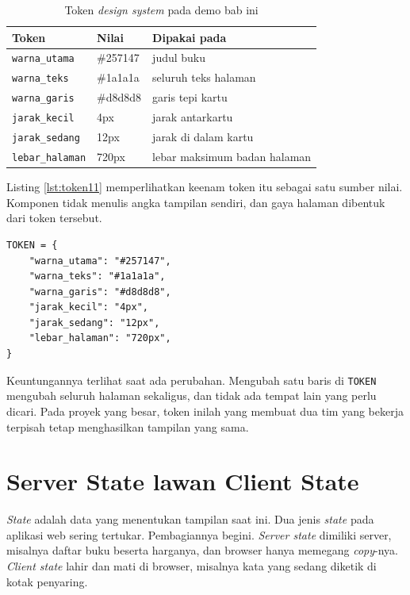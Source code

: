 \begin{table}[!htb]
  \centering
  \caption{Token \textit{design system} pada demo bab ini}
  \label{tab:token}
  \begin{tabularx}{\textwidth}{llX}
    \hline
    \textbf{Token} & \textbf{Nilai} & \textbf{Dipakai pada} \\
    \hline
    \texttt{warna\_utama} & \#257147 & judul buku \\
    \hline
    \texttt{warna\_teks} & \#1a1a1a & seluruh teks halaman \\
    \hline
    \texttt{warna\_garis} & \#d8d8d8 & garis tepi kartu \\
    \hline
    \texttt{jarak\_kecil} & 4px & jarak antarkartu \\
    \hline
    \texttt{jarak\_sedang} & 12px & jarak di dalam kartu \\
    \hline
    \texttt{lebar\_halaman} & 720px & lebar maksimum badan halaman \\
    \hline
  \end{tabularx}
\end{table}

Listing \ref{lst:token11} memperlihatkan keenam token itu sebagai satu
sumber nilai. Komponen tidak menulis angka tampilan sendiri, dan gaya halaman
dibentuk dari token tersebut.

\begin{lstlisting}[style=PythonStyle, caption={Token sebagai satu sumber nilai tampilan, tersedia di \berkas{sources/chapter11/komponen.py}}, label={lst:token11}]
TOKEN = {
    "warna_utama": "#257147",
    "warna_teks": "#1a1a1a",
    "warna_garis": "#d8d8d8",
    "jarak_kecil": "4px",
    "jarak_sedang": "12px",
    "lebar_halaman": "720px",
}
\end{lstlisting}

Keuntungannya terlihat saat ada perubahan. Mengubah satu baris di
\texttt{TOKEN} mengubah seluruh halaman sekaligus, dan tidak ada tempat lain
yang perlu dicari. Pada proyek yang besar, token inilah yang membuat dua tim
yang bekerja terpisah tetap menghasilkan tampilan yang sama.

\section{Server State lawan Client State}

\textit{State} adalah data yang menentukan tampilan saat ini. Dua jenis
\textit{state} pada aplikasi web sering tertukar. Pembagiannya begini.
\textit{Server state} dimiliki server, misalnya daftar buku beserta harganya,
dan browser hanya memegang \textit{copy}-nya. \textit{Client state} lahir dan mati di
browser, misalnya kata yang sedang diketik di kotak penyaring.

